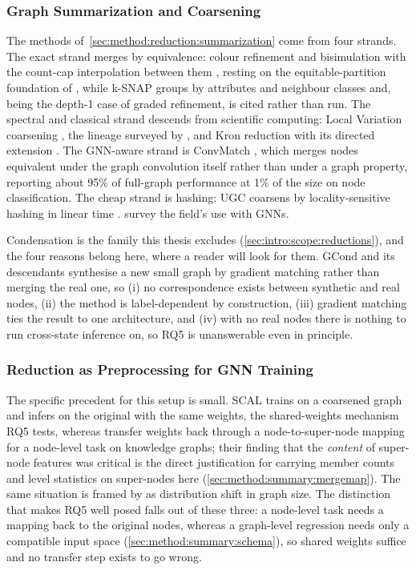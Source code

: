\subsubsection{Graph Summarization and Coarsening}
\label{sec:relwork:reduction:summarization}
The methods of~\ref{sec:method:reduction:summarization} come from four strands. The exact
strand merges by equivalence: colour refinement and bisimulation with the count-cap
interpolation between them \citep{bollen2023exact}, resting on the equitable-partition
foundation of \citet{grohe2014colourrefinement}, while k-SNAP \citep{tian2008ksnap}
groups by attributes and neighbour classes and, being the depth-1 case of graded
refinement, is cited rather than run. The spectral and classical strand descends from scientific
computing: Local Variation coarsening \citep{loukas2019localvariation}, the lineage
surveyed by \citet{chen2022coarsening}, and Kron reduction with its directed extension
\citep{sugiyama2023kron}. The GNN-aware strand is ConvMatch
\citep{dickens2024convmatch}, which merges nodes equivalent under the graph convolution
itself rather than under a graph property, reporting about 95\% of full-graph
performance at 1\% of the size on node classification. The cheap strand is hashing:
UGC coarsens by locality-sensitive hashing in linear time \citep{ugc2024}.
\citet{shabani2023summarization} survey the field's use with GNNs.

Condensation is the family this thesis excludes (\ref{sec:intro:scope:reductions}), and
the four reasons belong here, where a reader will look for them. GCond and its
descendants \citep{jin2022gcond} synthesise a new small graph by gradient matching
rather than merging the real one, so (i) no correspondence exists between synthetic and
real nodes, (ii) the method is label-dependent by construction, (iii) gradient matching
ties the result to one architecture, and (iv) with no real nodes there is nothing to run
cross-state inference on, so RQ5 is unanswerable even in principle.

\subsubsection{Reduction as Preprocessing for GNN Training}
\label{sec:relwork:reduction:forgnn}
The specific precedent for this setup is small. SCAL \citep{huang2021scal} trains on a
coarsened graph and infers on the original with the same weights, the shared-weights
mechanism RQ5 tests, whereas \citet{generale2022scaling} transfer weights back through a
node-to-super-node mapping for a node-level task on knowledge graphs; their finding that
the \emph{content} of super-node features was critical is the direct justification for
carrying member counts and level statistics on super-nodes here
(\ref{sec:method:summary:mergemap}). The same situation is framed by
\citet{buffelli2022sizeshift} as distribution shift in graph size. The distinction that makes RQ5 well posed
falls out of these three: a node-level task needs a mapping back to the original nodes,
whereas a graph-level regression needs only a compatible input space
(\ref{sec:method:summary:schema}), so shared weights suffice and no transfer step exists
to go wrong.
